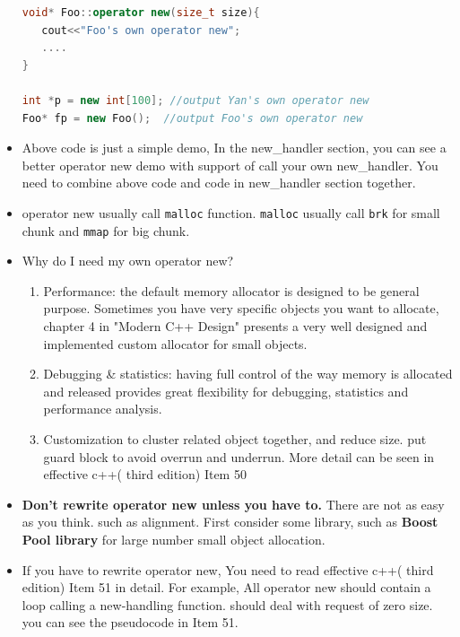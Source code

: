 \documentclass[a4paper,12pt,twoside]{book}
\begin{document}
\begin{itemize}
\begin{lstlisting}[frame=single, language=c++, mathescape=true]
void* Foo::operator new(size_t size){
   cout<<"Foo's own operator new";
   ....
}

int *p = new int[100]; //output Yan's own operator new
Foo* fp = new Foo();  //output Foo's own operator new
\end{lstlisting}

\item Above code is just a simple demo, In the new\_handler section, you can see a better operator new demo with support of call your own new\_handler. You need to combine above code and code in new\_handler section together. 

\item operator new usually call \texttt{malloc} function. \texttt{malloc} usually call \texttt{brk} for small chunk and \texttt{mmap} for big chunk.

\item Why do I need my own operator new?
\begin{enumerate}
\item Performance: the default memory allocator is designed to be general purpose. Sometimes you have very specific objects you want to allocate, chapter 4 in "Modern C++ Design" presents a very well designed and implemented custom allocator for small objects.

\item Debugging \& statistics: having full control of the way memory is allocated and released provides great flexibility for debugging, statistics and performance analysis.

\item Customization to cluster related object together, and reduce size. put guard block to avoid overrun and underrun. More detail can be seen in effective c++( third edition) Item 50
\end{enumerate}

\item \textbf{Don't rewrite operator new unless you have to.} There are not as easy as you think. such as alignment. First consider some library, such as \textbf{Boost Pool library} for large number small object allocation.

\item If you have to rewrite operator new, You need to read  effective c++( third edition) Item 51 in detail. For example, All operator new should contain a loop calling a new-handling function.  should deal with request of zero size. you can see the pseudocode in Item 51.



\end{itemize}
\end{document}
